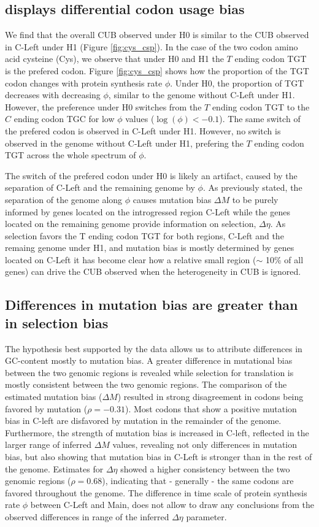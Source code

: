 \documentclass[12pt]{article}
\begin{document}
\subsection*{\kluyveri displays differential codon usage bias}
We find that the overall CUB observed under H0 is similar to the CUB observed in C-Left under H1 (Figure \ref{fig:cys_csp}).
In the case of the two codon amino acid cysteine (Cys), we observe that under H0 and H1 the $T$ ending codon TGT is the prefered codon.
Figure \ref{fig:cys_csp} shows how the proportion of the TGT codon changes with protein synthesis rate $\phi$.
Under H0, the proportion of TGT decreases with decreasing $\phi$, similar to the \kluyveri genome without C-Left under H1.
However, the preference under H0 switches from the $T$ ending codon TGT to the $C$ ending codon TGC for low $\phi$ values ($\log(\phi) < -0.1$).
The same switch of the prefered codon is observed in C-Left under H1.
However, no switch is observed in the \kluyveri genome without C-Left under H1, prefering the $T$ ending codon TGT across the whole spectrum of $\phi$.

The switch of the prefered codon under H0 is likely an artifact, caused by the separation of C-Left and the remaining genome by $\phi$. 
As previously stated, the separation of the genome along $\phi$ causes mutation bias $\Delta M$ to be purely informed by genes located on the introgressed region C-Left while the genes located on the remaining genome provide information on selection, $\Delta \eta$.
As selection favors the T ending codon TGT for both regions, C-Left and the remaing genome under H1, and mutation bias is mostly determined by genes located on C-Left it has become clear how a relative small region ($\sim$ 10\% of all genes) can drive the CUB observed when the heterogeneity in CUB is ignored.

\subsection*{Differences in mutation bias are greater than in selection bias}
The hypothesis best supported by the data allows us to attribute differences in GC-content mostly to mutation bias. 
A greater difference in mutational bias between the two genomic regions is revealed while selection for translation is mostly consistent between the two genomic regions. 
The comparison of the estimated mutation bias ($\Delta M$) resulted in strong disagreement in codons being favored by mutation ($\rho = -0.31$). 
Most codons that show a positive mutation bias in C-left are disfavored by mutation in the remainder of the genome.  
Furthermore, the strength of mutation bias is increased in C-left, reflected in the larger range of inferred $\Delta M$ values, revealing not only differences in mutation bias, but also showing that mutation bias in C-Left is stronger than in the rest of the genome. 
Estimates for $\Delta \eta$ showed a higher consistency between the two genomic regions ($\rho = 0.68$), indicating that - generally - the same codons are favored throughout the genome. 
The difference in time scale of protein synthesis rate $\phi$ between C-Left and Main, does not allow to draw any conclusions from the observed differences in range of the inferred $\Delta \eta$ parameter.
\end{document}
